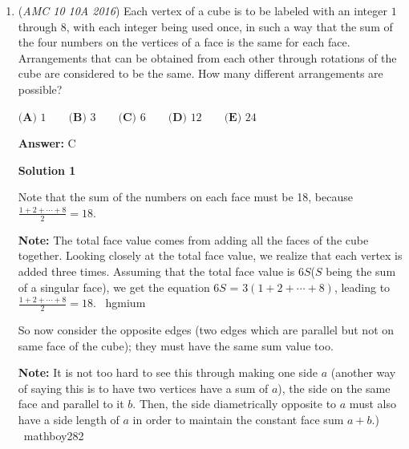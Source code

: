 \begin{enumerate}
 



\textbf{Solution 4}

Draw $N$ balls as described in the problem. First consider the left side arrangements. Notice that for at least $\frac{3}{5}N$ balls must be to the right of the valid left side arrangements. Since we have $N+1$ balls, we know that there are $\frac{2}{5}N+1$ valid left side arrangements. This also goes for the right side arrangements, for a total of 

 \begin{verbatim}
$\frac{4}{5}N + 2$ spaces, over a total possible $N + 1$ places to put the ball. So:
\end{verbatim}

$\frac{\frac{4}{5}N + 2}{N+1} = \frac{321}{400} \rightarrow N = 479.$ And we know that the next value is what we are looking for, so $N+1 = 480$, and the sum of its digits is $\boxed{\textbf{(A) } 12}$.

 


	\item (\textit{AMC 10 10A 2016}) Each vertex of a cube is to be labeled with an integer $1$ through $8$, with each integer being used once, in such a way that the sum of the four numbers on the vertices of a face is the same for each face. Arrangements that can be obtained from each other through rotations of the cube are considered to be the same. How many different arrangements are possible?


 $\textbf{(A) } 1\qquad\textbf{(B) } 3\qquad\textbf{(C) }6 \qquad\textbf{(D) }12 \qquad\textbf{(E) }24$

 \textbf{Answer: }C



\textbf{Solution 1}

Note that the sum of the numbers on each face must be 18, because $\frac{1+2+\cdots+8}{2}=18$. 

 \textbf{Note:} The total face value comes from adding all the faces of the cube together. Looking closely at the total face value, we realize that each vertex is added three times. Assuming that the total face value is $6S$($S$ being the sum of a singular face), we get the equation $6S$ = $3(1+2+\cdots+8)$, leading to $\frac{1+2+\cdots+8}{2}=18$. ~hgmium

 So now consider the opposite edges (two edges which are parallel but not on same face of the cube); they must have the same sum value too.

 \textbf{Note:} It is not too hard to see this through making one side $a$ (another way of saying this is to have two vertices have a sum of $a$), the side on the same face and parallel to it $b.$ Then, the side diametrically opposite to $a$ must also have a side length of $a$ in order to maintain the constant face sum $a+b.$) ~mathboy282


\end{enumerate}

